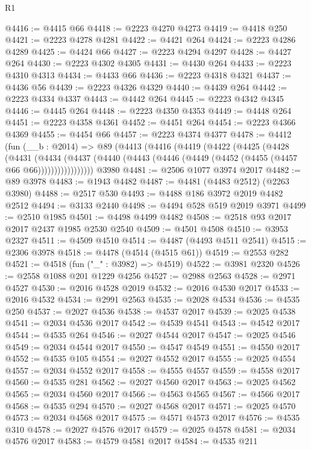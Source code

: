 \begin{lexlean}{R1}
\begin{coremodule}
@4416 := @4415 @66
@4418 := @2223 @4270 @4273
@4419 := @4418 @250
@4421 := @2223 @4278 @4281
@4422 := @4421 @264
@4424 := @2223 @4286 @4289
@4425 := @4424 @66
@4427 := @2223 @4294 @4297
@4428 := @4427 @264
@4430 := @2223 @4302 @4305
@4431 := @4430 @264
@4433 := @2223 @4310 @4313
@4434 := @4433 @66
@4436 := @2223 @4318 @4321
@4437 := @4436 @56
@4439 := @2223 @4326 @4329
@4440 := @4439 @264
@4442 := @2223 @4334 @4337
@4443 := @4442 @264
@4445 := @2223 @4342 @4345
@4446 := @4445 @264
@4448 := @2223 @4350 @4353
@4449 := @4448 @264
@4451 := @2223 @4358 @4361
@4452 := @4451 @264
@4454 := @2223 @4366 @4369
@4455 := @4454 @66
@4457 := @2223 @4374 @4377
@4478 := @4412
    (fun (__b : @2014) =>
    @89
      (@4413
        (@4416
          (@4419
            (@4422
              (@4425
                (@4428
                  (@4431
                    (@4434
                      (@4437
                        (@4440 (@4443 (@4446 (@4449 (@4452 (@4455 (@4457 @66 @66)))))))))))))))))
    @3980
@4481 := @2506 @1077 @3974 @2017
@4482 := @89 @3978
@4483 := @1943 @4482
@4487 := @4481 (@4483 @2512) (@2263 @3980)
@4488 := @2517 @530
@4493 := @4488 @186 @3972 @2019 @4482 @2512
@4494 := @3133 @2440
@4498 := @4494 @528 @519 @2019 @3971
@4499 := @2510 @1985
@4501 := @4498 @4499 @4482
@4508 := @2518 @93 @2017 @2017 @2437 @1985 @2530 @2540
@4509 := @4501 @4508
@4510 := @3953 @2327
@4511 := @4509 @4510
@4514 := @4487 (@4493 @4511 @2541)
@4515 := @2306 @3978
@4518 := @4478 (@4514 (@4515 @61))
@4519 := @2553 @282
@4521 := @4518 (fun ("_" : @3982) => @4519)
@4522 := @3981 @2320
@4526 := @2558 @1088 @201 @1229 @4256
@4527 := @2988 @2563
@4528 := @2971 @4527
@4530 := @2016 @4528 @2019
@4532 := @2016 @4530 @2017
@4533 := @2016 @4532
@4534 := @2991 @2563
@4535 := @2028 @4534
@4536 := @4535 @250
@4537 := @2027 @4536
@4538 := @4537 @2017
@4539 := @2025 @4538
@4541 := @2034 @4536 @2017
@4542 := @4539 @4541
@4543 := @4542 @2017
@4544 := @4535 @264
@4546 := @2027 @4544 @2017
@4547 := @2025 @4546
@4549 := @2034 @4544 @2017
@4550 := @4547 @4549
@4551 := @4550 @2017
@4552 := @4535 @105
@4554 := @2027 @4552 @2017
@4555 := @2025 @4554
@4557 := @2034 @4552 @2017
@4558 := @4555 @4557
@4559 := @4558 @2017
@4560 := @4535 @281
@4562 := @2027 @4560 @2017
@4563 := @2025 @4562
@4565 := @2034 @4560 @2017
@4566 := @4563 @4565
@4567 := @4566 @2017
@4568 := @4535 @294
@4570 := @2027 @4568 @2017
@4571 := @2025 @4570
@4573 := @2034 @4568 @2017
@4575 := @4571 @4573 @2017
@4576 := @4535 @310
@4578 := @2027 @4576 @2017
@4579 := @2025 @4578
@4581 := @2034 @4576 @2017
@4583 := @4579 @4581 @2017
@4584 := @4535 @211

\end{coremodule}
\end{lexlean}
